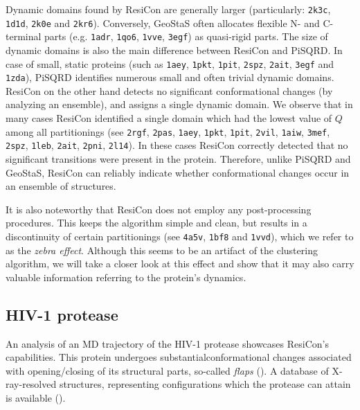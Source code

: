 Dynamic domains found by ResiCon are generally larger (particularly: \texttt{2k3c}, \texttt{1d1d}, \texttt{2k0e} and \texttt{2kr6}).
Conversely, GeoStaS often allocates flexible N- and C-terminal parts (e.g. \texttt{1adr}, \texttt{1qo6}, \texttt{1vve}, \texttt{3egf}) as quasi-rigid parts.
The size of dynamic domains is also the main difference between ResiCon and PiSQRD.
In case of small, static proteins (such as \texttt{1aey}, \texttt{1pkt}, \texttt{1pit}, \texttt{2spz}, \texttt{2ait}, \texttt{3egf} and \texttt{1zda}), PiSQRD identifies numerous small and often trivial dynamic domains. 
ResiCon on the other hand detects no significant conformational changes (by analyzing an ensemble), and assigns a single dynamic domain.
We observe that in many cases ResiCon identified a single domain which had the lowest value of $Q$ among all partitionings (see \texttt{2rgf}, \texttt{2pas}, \texttt{1aey}, \texttt{1pkt}, \texttt{1pit}, \texttt{2vil}, \texttt{1aiw}, \texttt{3mef}, \texttt{2spz}, \texttt{1leb}, \texttt{2ait}, \texttt{2pni}, \texttt{2l14}).
In these cases ResiCon correctly detected that no significant transitions were present in the protein.
Therefore, unlike PiSQRD and GeoStaS, ResiCon can reliably indicate whether conformational changes occur in an ensemble of structures.

It is also noteworthy that ResiCon does not employ any post-processing procedures.
This keeps the algorithm simple and clean, but results in a discontinuity of certain partitionings (see \texttt{4a5v}, \texttt{1bf8} and \texttt{1vvd}), which we refer to as the \emph{zebra effect}.
Although this seems to be an artifact of the clustering algorithm, we will take a closer look at this effect and show that it may also carry valuable information referring to the protein's dynamics.

\subsection*{HIV-1 protease}
An analysis of an MD trajectory of the HIV-1 protease showcases ResiCon's capabilities.
This protein undergoes substantial\break conformational changes associated with opening/closing of its structural parts, so-called \emph{flaps} (\cite{hamelberg2005fast}).
A database of X-ray-resolved structures, representing configurations which the protease can attain is available (\cite{vondrasek2002hivdb}).

